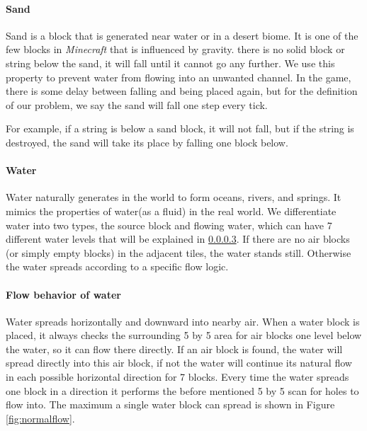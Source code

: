 \paragraph{Sand\cite{minecraftfandom:sand}}
Sand is a block that is generated near water or in a desert biome.
It is one of the few blocks in \textit{Minecraft} that is influenced by gravity.
 there is no solid block or string below the sand, it will fall until it cannot go any further.
We use this property to prevent water from flowing into an unwanted channel. In the game, there is some delay between falling and being placed again, but for the definition of our problem, we say the sand will fall one step every tick.

\noindent \newline For example, if a string is below a sand block, it will not fall, but if the string is destroyed, the sand will take its place by falling one block below.

\paragraph{Water}
Water naturally generates in the world to form oceans, rivers, and springs\cite{minecraftfandom:water}. 
It mimics the properties of water(as a fluid) in the real world.
We differentiate water into two types, the source block and flowing water, which can have 7 different water levels that will be explained in \ref{waterflow}. 
If there are no air blocks (or simply empty blocks) in the adjacent tiles,
the water stands still. Otherwise the water spreads according to a specific flow logic.

\paragraph{Flow behavior of water} \label{waterflow}
Water spreads horizontally and downward into nearby air. When a water block is placed, it always checks the surrounding 5 by 5 area for air blocks one level below the water, so it can flow there directly. If an air block is found, the water will spread directly into this air block, if not the water will continue its natural flow in each possible horizontal direction for 7 blocks. Every time the water spreads one block in a direction it performs the before mentioned 5 by 5 scan for holes to flow into. The maximum a single water block can spread is shown in Figure \ref{fig:normalflow}.

